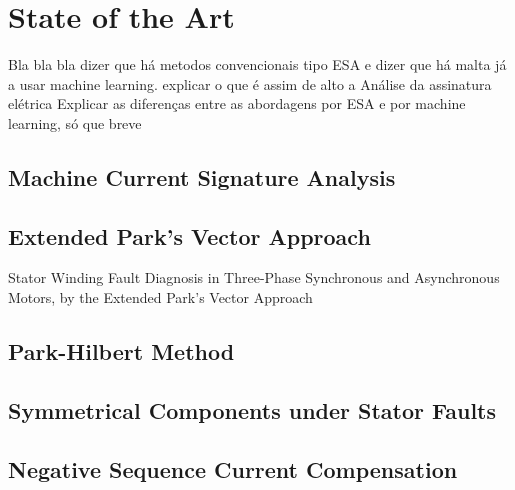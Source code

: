 \chapter{State of the Art}
\label{cha:state_of_the_art}

Bla bla bla dizer que há metodos convencionais tipo ESA e dizer que há malta já a usar machine learning.
explicar o que é assim de alto a Análise da assinatura elétrica 
Explicar as diferenças entre as abordagens por ESA e por machine learning, só que breve


\section{Machine Current Signature Analysis} %
\label{sec:mcsa}

\section{Extended Park's Vector Approach} %
\label{sec:epva}

Stator Winding Fault Diagnosis in Three-Phase Synchronous and Asynchronous Motors, by the Extended Park’s Vector Approach


\section{Park-Hilbert Method} %
\label{sec:park_hilbert_method}

\section{Symmetrical Components under Stator Faults} %
\label{sec:symmetrical_components}

\section{Negative Sequence Current Compensation} %
\label{sec:negative_sequence_current_compensation}

